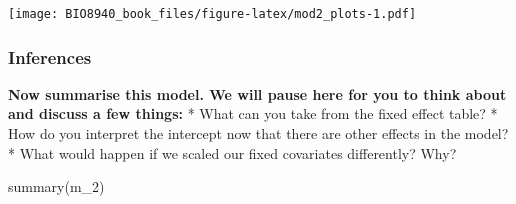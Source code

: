 \documentclass[
  12pt,
]{book}
\newenvironment{Shaded}{\begin{snugshade}}{\end{snugshade}}
\newcommand{\AttributeTok}[1]{\textcolor[rgb]{0.77,0.63,0.00}{#1}}
\newcommand{\CommentTok}[1]{\textcolor[rgb]{0.56,0.35,0.01}{\textit{#1}}}
\newcommand{\DecValTok}[1]{\textcolor[rgb]{0.00,0.00,0.81}{#1}}
\newcommand{\FloatTok}[1]{\textcolor[rgb]{0.00,0.00,0.81}{#1}}
\newcommand{\FunctionTok}[1]{\textcolor[rgb]{0.00,0.00,0.00}{#1}}
\newcommand{\NormalTok}[1]{#1}
\newcommand{\OtherTok}[1]{\textcolor[rgb]{0.56,0.35,0.01}{#1}}
\newcommand{\SpecialCharTok}[1]{\textcolor[rgb]{0.00,0.00,0.00}{#1}}
\newcommand{\StringTok}[1]{\textcolor[rgb]{0.31,0.60,0.02}{#1}}
\begin{document}
\begin{Shaded}
\end{Shaded}

\texttt{[image: BIO8940\_book\_files/figure-latex/mod2\_plots-1.pdf]}

\hypertarget{inferences}{%
\subsubsection{Inferences}\label{inferences}}

\textbf{Now summarise this model. We will pause here for you to think about and discuss a few things:}
* What can you take from the fixed effect table?
* How do you interpret the intercept now that there are other effects in the model?
* What would happen if we scaled our fixed covariates differently? Why?

\begin{Shaded}
\begin{Highlighting}[]
\FunctionTok{summary}\NormalTok{(m\_2)}
\end{Highlighting}
\end{Shaded}
\end{document}
